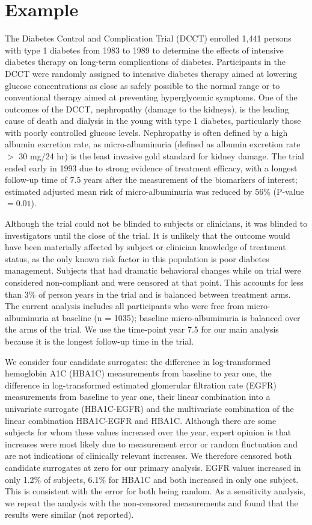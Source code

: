 \documentclass[times, doublespace]{simauth}
\begin{document}
\section{Example}
The Diabetes Control and Complication Trial (DCCT) enrolled 1,441 persons with type 1 diabetes from 1983 to 1989 to determine the effects of intensive diabetes therapy on long-term complications of diabetes. Participants in the DCCT were randomly assigned to intensive diabetes therapy aimed at lowering glucose concentrations as close as safely possible to the normal range or to conventional therapy aimed at preventing hyperglycemic symptoms. One of the outcomes of the DCCT, nephropathy (damage to the kidneys), is the leading cause of death and dialysis in the young with type 1 diabetes, particularly those with poorly controlled glucose levels. Nephropathy is often defined by a high albumin excretion rate, as micro-albuminuria (defined as albumin excretion rate $>$ 30 mg/24 hr) is the least invasive gold standard for kidney damage. The trial ended early in 1993 due to strong evidence of treatment efficacy, with a longest follow-up time of 7.5 years after the measurement of the biomarkers of interest; estimated adjusted mean risk of micro-albuminuria was reduced by 56\% (P-value $=0.01$)\citep{DCCT}. 

Although the trial could not be blinded to subjects or clinicians, it was blinded to investigators until the close of the trial. It is unlikely that the outcome would have been materially affected by subject or clinician knowledge of treatment status, as the only known risk factor in this population is poor diabetes management. Subjects that had dramatic behavioral changes while on trial were considered non-compliant and were censored at that point. This accounts for less than 3\% of person years in the trial and is balanced between treatment arms. The current analysis includes all participants who were free from micro-albuminuria at baseline (n = 1035); baseline micro-albuminuria is balanced over the arms of the trial. We use the time-point year 7.5 for our main analysis because it is the longest follow-up time in the trial.

We consider four candidate surrogates: the difference in log-transformed hemoglobin A1C (HBA1C) measurements from baseline to year one, the difference in log-transformed estimated glomerular filtration rate (EGFR) measurements from baseline to year one, their linear combination into a univariate surrogate (HBA1C-EGFR) and the multivariate combination of the linear combination HBA1C-EGFR and HBA1C. Although there are some subjects for whom these values increased over the year, expert opinion is that increases were most likely due to measurement error or random fluctuation and are not indications of clinically relevant increases. We therefore censored both candidate surrogates at zero for our primary analysis. EGFR values increased in only 1.2\% of subjects, 6.1\% for HBA1C and both increased in only one subject. This is consistent with the error for both being random. As a sensitivity analysis, we repeat the analysis with the non-censored measurements and found that the results were similar (not reported). 
\end{document}
